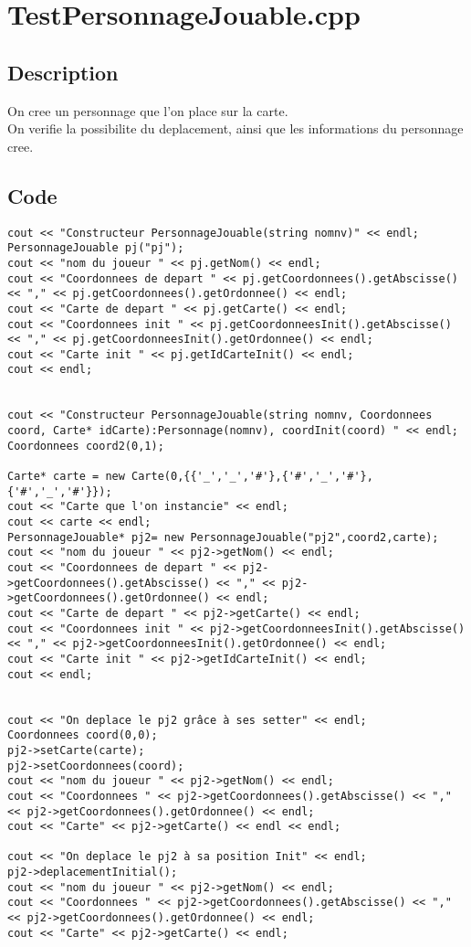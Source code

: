     \section{TestPersonnageJouable.cpp}
        \subsection{Description}
            On cree un personnage que l'on place sur la carte.\\
            On verifie la possibilite du deplacement, ainsi que les informations du personnage cree.
        \subsection{Code}
\begin{lstlisting}
cout << "Constructeur PersonnageJouable(string nomnv)" << endl;
PersonnageJouable pj("pj");
cout << "nom du joueur " << pj.getNom() << endl;
cout << "Coordonnees de depart " << pj.getCoordonnees().getAbscisse() << "," << pj.getCoordonnees().getOrdonnee() << endl;
cout << "Carte de depart " << pj.getCarte() << endl;
cout << "Coordonnees init " << pj.getCoordonneesInit().getAbscisse() << "," << pj.getCoordonneesInit().getOrdonnee() << endl;
cout << "Carte init " << pj.getIdCarteInit() << endl;
cout << endl;


cout << "Constructeur PersonnageJouable(string nomnv, Coordonnees coord, Carte* idCarte):Personnage(nomnv), coordInit(coord) " << endl;
Coordonnees coord2(0,1);

Carte* carte = new Carte(0,{{'_','_','#'},{'#','_','#'},{'#','_','#'}});
cout << "Carte que l'on instancie" << endl;
cout << carte << endl;
PersonnageJouable* pj2= new PersonnageJouable("pj2",coord2,carte);
cout << "nom du joueur " << pj2->getNom() << endl;
cout << "Coordonnees de depart " << pj2->getCoordonnees().getAbscisse() << "," << pj2->getCoordonnees().getOrdonnee() << endl;
cout << "Carte de depart " << pj2->getCarte() << endl;
cout << "Coordonnees init " << pj2->getCoordonneesInit().getAbscisse() << "," << pj2->getCoordonneesInit().getOrdonnee() << endl;
cout << "Carte init " << pj2->getIdCarteInit() << endl;
cout << endl;


cout << "On deplace le pj2 grâce à ses setter" << endl;
Coordonnees coord(0,0);
pj2->setCarte(carte);
pj2->setCoordonnees(coord);
cout << "nom du joueur " << pj2->getNom() << endl;
cout << "Coordonnees " << pj2->getCoordonnees().getAbscisse() << "," << pj2->getCoordonnees().getOrdonnee() << endl;
cout << "Carte" << pj2->getCarte() << endl << endl;

cout << "On deplace le pj2 à sa position Init" << endl;
pj2->deplacementInitial();
cout << "nom du joueur " << pj2->getNom() << endl;
cout << "Coordonnees " << pj2->getCoordonnees().getAbscisse() << "," << pj2->getCoordonnees().getOrdonnee() << endl;
cout << "Carte" << pj2->getCarte() << endl;	
	\end{lstlisting}
